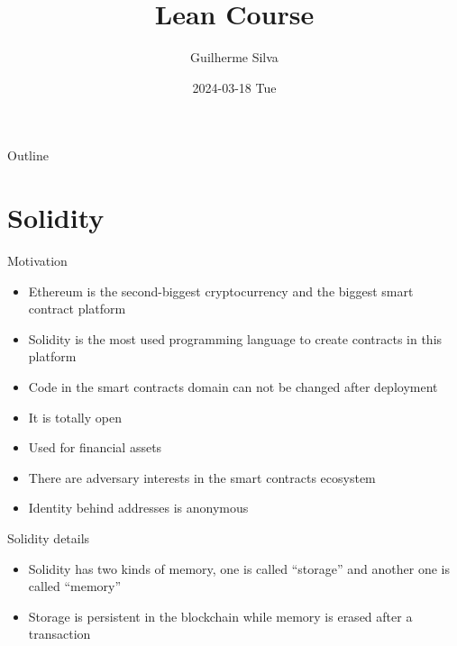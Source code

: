 \documentclass[bigger]{beamer}
\author{Guilherme Silva}
\date{2024-03-18 Tue}
\title{Lean Course}
\begin{document}
\maketitle
\begin{frame}{Outline}
\tableofcontents
\end{frame}

\section{Solidity}
\label{sec:org2401091}
\begin{frame}[label={sec:org3dcd1ba}]{Motivation}
\begin{itemize}
\item Ethereum is the second-biggest cryptocurrency and the biggest smart contract platform
\item Solidity is the most used programming language to create contracts in this platform
\item Code in the smart contracts domain can not be changed after deployment
\item It is totally open
\item Used for financial assets
\item There are adversary interests in the smart contracts ecosystem
\item Identity behind addresses is anonymous
\end{itemize}
\end{frame}
\begin{frame}[label={sec:orgdca0b94}]{Solidity details}
\begin{itemize}
\item Solidity has two kinds of memory, one is called ``storage'' and another one is called ``memory''
\item Storage is persistent in the blockchain while memory is erased after a transaction
\end{itemize}
\end{frame}
\end{document}
